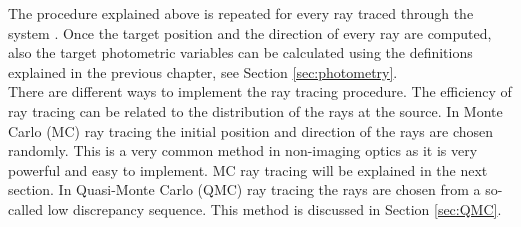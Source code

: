 The procedure explained above is repeated for every ray traced through the system \cite{Gross2005Handbook}. 
Once the target position and the direction of every ray are computed, also the target photometric variables can be calculated using the definitions explained in the previous chapter, see Section \ref{sec:photometry}.
\\ \indent
There are different ways to implement the ray tracing procedure. The efficiency of ray tracing can be related to the distribution of the rays at the source. 
In Monte Carlo (MC) ray tracing the initial position and direction of the rays are chosen randomly. This is a very common method in non-imaging optics as it is very powerful and easy to implement. MC ray tracing will be explained in the next section.
In Quasi-Monte Carlo (QMC) ray tracing the rays are chosen from a so-called low discrepancy sequence. This method is discussed in Section \ref{sec:QMC}.
